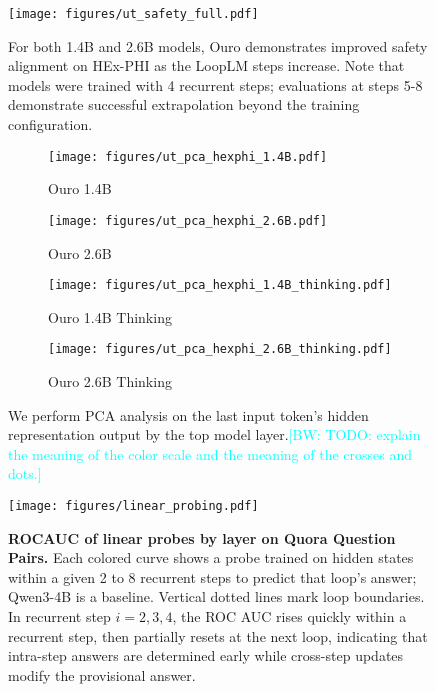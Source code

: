 \documentclass[]{bytedance_seed}
\newcommand{\1}{\mathbf{1}}
\newcommand{\ut}{LoopLM}
\newcommand{\boyi}[1]{\textcolor{cyan}{[BW: #1]}}
\begin{document}
\begin{figure}[t]
    \centering
     \texttt{[image: figures/ut\_safety\_full.pdf]}
      \caption{For both 1.4B and 2.6B models, Ouro demonstrates improved safety alignment on HEx-PHI as the \ut{} steps increase. Note that models were trained with 4 recurrent steps; evaluations at steps 5-8 demonstrate successful extrapolation beyond the training configuration.}
      \label{fig:ut_safety}
\end{figure}




\begin{figure}[ht]
    \centering
    \begin{subfigure}{\textwidth}
        \centering
        \texttt{[image: figures/ut\_pca\_hexphi\_1.4B.pdf]}
        \caption{Ouro 1.4B}
    \label{fig:ut_pca_hexphi_1.4B}
    \end{subfigure}
    \begin{subfigure}{\textwidth}
    \centering
    \texttt{[image: figures/ut\_pca\_hexphi\_2.6B.pdf]}
    \caption{Ouro 2.6B}
    \label{fig:ut_pca_hexphi_2.6B}
    \end{subfigure}
    \begin{subfigure}{\textwidth}
    \centering
    \texttt{[image: figures/ut\_pca\_hexphi\_1.4B\_thinking.pdf]}
    \caption{Ouro 1.4B Thinking}
    \label{fig:ut_pca_hexphi_1.4B_thinking}
    \end{subfigure}
    \begin{subfigure}{\textwidth}
    \centering
    \texttt{[image: figures/ut\_pca\_hexphi\_2.6B\_thinking.pdf]}
    \caption{Ouro 2.6B Thinking}
    \label{fig:ut_pca_hexphi_2.6B_thinking}
    \end{subfigure}
    \caption{We perform PCA analysis on the last input token's hidden representation output by the top model layer.\boyi{TODO: explain the meaning of the color scale and the meaning of the crosses and dots.}}
    \label{fig:pca_hex_phi}
    
\end{figure}



\begin{figure}[h]
    \centering
    \texttt{[image: figures/linear\_probing.pdf]}
    \caption{\textbf{ROCAUC of linear probes by layer on Quora Question Pairs.} Each colored curve shows a probe trained on hidden states within a given 2 to 8 recurrent steps to predict that loop’s answer; Qwen3-4B is a baseline. Vertical dotted lines mark loop boundaries. In recurrent step $i=2,3,4$, the ROC AUC rises quickly within a recurrent step, then partially resets at the next loop, indicating that intra-step answers are determined early while cross-step updates modify the provisional answer.}
    \label{fig:linear_probing}
\end{figure}
\end{document}
